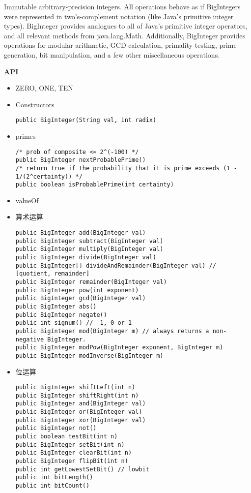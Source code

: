 Immutable arbitrary-precision integers. All operations behave as if BigIntegers were represented in two's-complement notation (like Java's primitive integer types). BigInteger provides analogues to all of Java's primitive integer operators, and all relevant methods from java.lang.Math. Additionally, BigInteger provides operations for modular arithmetic, GCD calculation, primality testing, prime generation, bit manipulation, and a few other miscellaneous operations.

\textbf{API}
\begin{itemize}
\item ZERO, ONE, TEN

\item Constructors
\begin{lstlisting}
public BigInteger(String val, int radix)
\end{lstlisting}

\item primes
\begin{lstlisting}
/* prob of composite <= 2^(-100) */
public BigInteger nextProbablePrime() 
/* return true if the probability that it is prime exceeds (1 - 1/(2^certainty)) */
public boolean isProbablePrime(int certainty)
\end{lstlisting}

\item valueOf

\item 算术运算
\begin{lstlisting}
public BigInteger add(BigInteger val)
public BigInteger subtract(BigInteger val)
public BigInteger multiply(BigInteger val)
public BigInteger divide(BigInteger val)
public BigInteger[] divideAndRemainder(BigInteger val) // [quotient, remainder]
public BigInteger remainder(BigInteger val)
public BigInteger pow(int exponent)
public BigInteger gcd(BigInteger val)
public BigInteger abs()
public BigInteger negate()
public int signum() // -1, 0 or 1
public BigInteger mod(BigInteger m) // always returns a non-negative BigInteger.
public BigInteger modPow(BigInteger exponent, BigInteger m)
public BigInteger modInverse(BigInteger m)
\end{lstlisting}

\item 位运算
\begin{lstlisting}
public BigInteger shiftLeft(int n)
public BigInteger shiftRight(int n)
public BigInteger and(BigInteger val)
public BigInteger or(BigInteger val)
public BigInteger xor(BigInteger val)
public BigInteger not()
public boolean testBit(int n)
public BigInteger setBit(int n)
public BigInteger clearBit(int n)
public BigInteger flipBit(int n)
public int getLowestSetBit() // lowbit
public int bitLength()
public int bitCount()
\end{lstlisting}


\end{itemize}
